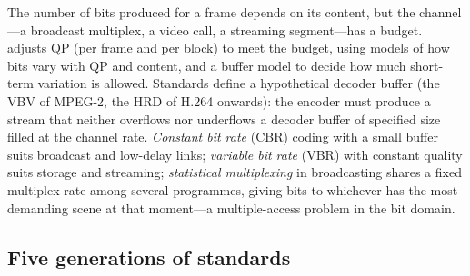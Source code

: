 The number of bits produced for a frame depends on its content, but the channel---a broadcast multiplex,
a video call, a streaming segment---has a budget.  adjusts QP (per frame and per block)
to meet the budget, using models of how bits vary with QP and content, and a buffer model to decide how
much short-term variation is allowed. Standards define a hypothetical decoder buffer (the VBV of MPEG-2,
the HRD of H.264 onwards): the encoder must produce a stream that neither overflows nor underflows a
decoder buffer of specified size filled at the channel rate. \emph{Constant bit rate} (CBR) coding with a
small buffer suits broadcast and low-delay links; \emph{variable bit rate} (VBR) with constant quality
suits storage and streaming; \emph{statistical multiplexing} in broadcasting shares a fixed multiplex
rate among several programmes, giving bits to whichever has the most demanding scene at that moment---a
multiple-access problem in the bit domain.

\subsection{Five generations of standards}

